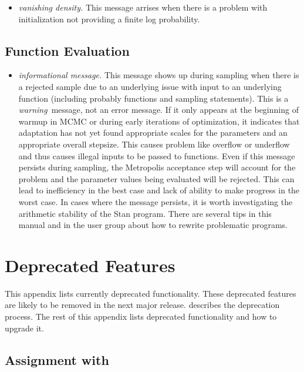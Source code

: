 \begin{itemize}
\item {\it vanishing density.} This message arrises when there is a
  problem with initialization not providing a finite log probability.
%
\end{itemize}

\section{Function Evaluation}

\begin{itemize}
\item {\it informational message.}  This message shows up during
  sampling when there is a rejected sample due to an underlying issue
  with input to an underlying function (including probably functions
  and sampling statements).  This is a {\it warning}\, message, not an
  error message.  If it only appears at the beginning of warmup in
  MCMC or during early iterations of optimization, it indicates that
  adaptation has not yet found appropriate scales for the parameters
  and an appropriate overall stepsize.  This causes problem like
  overflow or underflow and thus causes illegal inputs to be passed to
  functions.  Even if this message persists during sampling, the
  Metropolis acceptance step will account for the problem and the
  parameter values being evaluated will be rejected.  This can lead to
  inefficiency in the best case and lack of ability to make progress
  in the worst case.  In cases where the message persists, it is worth
  investigating the arithmetic stability of the Stan program.  There
  are several tips in this manual and in the user group about how to
  rewrite problematic programs.
\end{itemize}

\chapter{Deprecated Features}\label{deprecated-features.appendix}

\noindent
This appendix lists currently deprecated functionality.  These
deprecated features are likely to be removed in the next major
release.   describes the deprecation
process.  The rest of this appendix lists deprecated functionality and
how to upgrade it.

\section{Assignment with \code{<-}}

